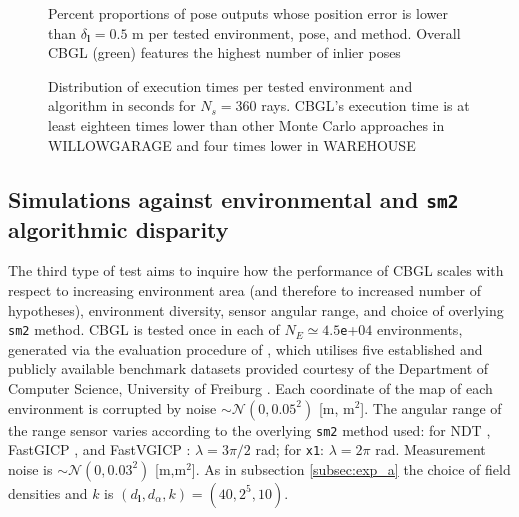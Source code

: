\begin{figure}
  
  \caption{\small Percent proportions of pose outputs whose position error is
           lower than $\delta_{\bm{l}} = 0.5$ m per tested environment, pose,
           and method. Overall CBGL (green) features the highest number of
           inlier poses}
  \label{fig:b:inliers_per_pose}
\end{figure}

\begin{figure}
  
  \vspace{0.1cm}
  \caption{\small Distribution of execution times per tested environment and
           algorithm in seconds for $N_s = 360$ rays. CBGL's execution time is
           at least eighteen times lower than other Monte Carlo approaches in
           WILLOWGARAGE and four times lower in WAREHOUSE}
  \label{fig:b:execution_times}
  \vspace{-0.5cm}
\end{figure}


\subsection{Simulations against environmental and \texttt{sm2} algorithmic disparity}
\label{subsec:exp_c}

The third type of test aims to inquire how the performance of CBGL scales with
respect to increasing environment area (and therefore to increased number of
hypotheses), environment diversity, sensor angular range, and choice of
overlying \texttt{sm2} method. CBGL is tested once in each of
$N_E \simeq 4.5$\texttt{e}+$04$ environments, generated via the evaluation
procedure of \cite{Filotheou2023a}, which utilises five established and
publicly available benchmark datasets provided courtesy of the Department of
Computer Science, University of Freiburg \cite{datasets_link}.  Each coordinate
of the map of each environment is corrupted by noise
$\sim\mathcal{N}(0,0.05^2)$ [m, m$^2$]. The angular range of the range sensor
varies according to the overlying \texttt{sm2} method used: for
NDT \cite{ndt}, FastGICP \cite{fgi}, and FastVGICP \cite{fvg}: $\lambda =
3\pi/2$ rad; for \texttt{x1}: $\lambda = 2\pi$ rad. Measurement noise is
$\sim \mathcal{N}(0,0.03^2)$ [m,m$^2$]. As in subsection \ref{subsec:exp_a} the
choice of field densities and $k$ is $(d_{\bm{l}},d_{\alpha},k) = (40, 2^5,
10)$.

